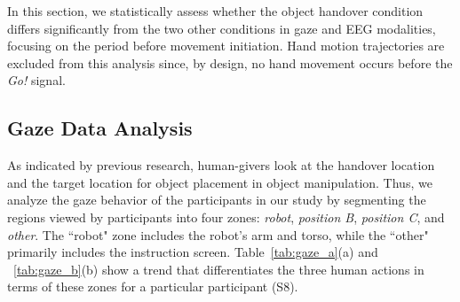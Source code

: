 In this section, we statistically assess whether the object handover condition differs significantly from the two other conditions in gaze and EEG modalities, focusing on the period before movement initiation. Hand motion trajectories are excluded from this analysis since, by design, no hand movement occurs before the \emph{Go!} signal.

\subsection*{Gaze Data Analysis}
As indicated by previous research, human-givers look at the handover location and the target location for object placement in object manipulation. Thus, we analyze the gaze behavior of the participants in our study by segmenting the regions viewed by participants into four zones: \emph{robot}, \emph{position B}, \emph{position C}, and \emph{other}. The ``robot" zone includes the robot's arm and torso, while the ``other" primarily includes the instruction screen. Table~\ref{tab:gaze_a}(a) and ~\ref{tab:gaze_b}(b) show a trend that differentiates the three human actions in terms of these zones for a particular participant (S8).
